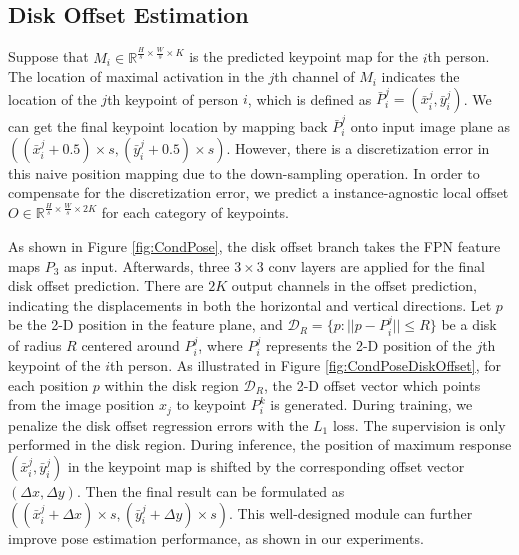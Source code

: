 \documentclass[sigconf]{acmart}
\begin{document}
\subsection{Disk Offset Estimation}
Suppose that $M_{i} \in \mathbb{R}^{\frac{H}{s} \times \frac{W}{s} \times K}$ is the predicted keypoint map for the $i$th person. 
The location of maximal activation in the $j$th channel of $M_{i}$ indicates the location of the $j$th keypoint of person $i$, 
which is defined as $\bar{P}_{i}^{j} = ( \bar{x}_{i}^{j}, \bar{y}_{i}^{j} )$. 
We can get the final keypoint location by mapping back $\bar{P}_{i}^{j}$ onto input image plane as $((\bar{x}_{i}^{j} + 0.5) \times s, (\bar{y}_{i}^{j} + 0.5) \times s)$.
However, there is a discretization error in this naive position mapping due to the down-sampling operation.
In order to compensate for the discretization error, we predict a instance-agnostic local offset $O \in \mathbb{R}^{\frac{H}{s} \times \frac{W}{s} \times 2K}$ for each category of keypoints.

As shown in Figure \ref{fig:CondPose}, the disk offset branch takes the FPN feature maps $P_{3}$ as input.
Afterwards, three $3 \times 3$ conv layers are applied for the final disk offset prediction.
There are $2K$ output channels in the offset prediction, indicating the displacements in both the horizontal and vertical directions.
Let $p$ be the 2-D position in the feature plane, and
\begin{math}
  \mathcal{D}_{R} = \{ p : || p - P_{i}^{j} || \le R \}
\end{math}
be a disk of radius $R$ centered around $P_{i}^{j}$, where $P_{i}^{j}$ represents the 2-D position of the $j$th keypoint of the $i$th person.
As illustrated in Figure \ref{fig:CondPoseDiskOffset}, for each position $p$ within the disk region $\mathcal{D}_{R}$, the 2-D offset vector which points from the image position $x_{j}$ to keypoint $P_{i}^{k}$ is generated.
During training, we penalize the disk offset regression errors with the $L_{1}$ loss.
The supervision is only performed in the disk region.
During inference, the position of maximum response $(\bar{x}_{i}^{j}, \bar{y}_{i}^{j})$ in the keypoint map is shifted by the corresponding offset vector $(\Delta x, \Delta y)$.
Then the final result can be formulated as
\begin{math}
  ((\bar{x}_{i}^{j}+\Delta x) \times s, (\bar{y}_{i}^{j}+\Delta y) \times s)
\end{math}.
This well-designed module can further improve pose estimation performance, as shown in our experiments.
\end{document}

